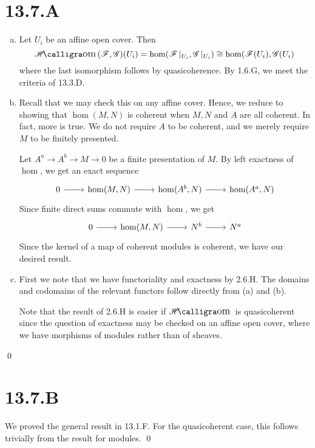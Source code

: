 \documentclass{article}
\begin{document}
\section{13.7.A}
\begin{enumerate}[a.]
    \item Let $U_i$ be an affine open cover. Then \[\Hom(\Fsh, \Gsh)(U_i)=\hom(\Fsh|_{U_i}, \Gsh|_{U_i}) \cong
              \hom(\Fsh(U_i), \Gsh(U_i)\]
          where the last isomorphism follows by quasicoherence. By 1.6.G, we meet the
          criteria of 13.3.D.
    \item Recall that we may check this on any affine cover. Hence, we reduce to showing
          that $\hom(M, N)$ is coherent when $M, N$ and
          $A$ are all coherent. In fact, more is true. We do not
          require $A$ to be coherent, and we merely require
          $M$ to be finitely presented.

          Let $A^a \to A^b \to M \to 0$ be a finite presentation of $M$.
          By left exactness of $\hom$, we get an exact sequence
          \[\begin{tikzcd}
                  0 & {\hom(M, N)} & {\hom(A^b, N)} & {\hom(A^a, N)}
                  \arrow[from=1-1, to=1-2]
                  \arrow[from=1-2, to=1-3]
                  \arrow[from=1-3, to=1-4]
              \end{tikzcd}\] Since finite direct sums commute with
          $\hom$, we get \[\begin{tikzcd}
                  0 & {\hom(M, N)} & {N^b} & {N^a}
                  \arrow[from=1-1, to=1-2]
                  \arrow[from=1-2, to=1-3]
                  \arrow[from=1-3, to=1-4]
              \end{tikzcd}\] Since the kernel of a map
          of coherent modules is coherent, we have our desired result.
    \item First we note that we have functoriality and exactness by 2.6.H. The domains
          and codomains of the relevant functors follow directly from (a) and (b).

          Note that the result of 2.6.H is easier if $\Hom$ is
          quasicoherent since the question of exactness may be checked on an affine open
          cover, where we have morphisms of modules rather than of sheaves.
\end{enumerate}

\qed

\section*{13.7.B}
We proved the general result in 13.1.F. For the quasicoherent case, this
follows trivially from the result for modules. \qed
\end{document}
